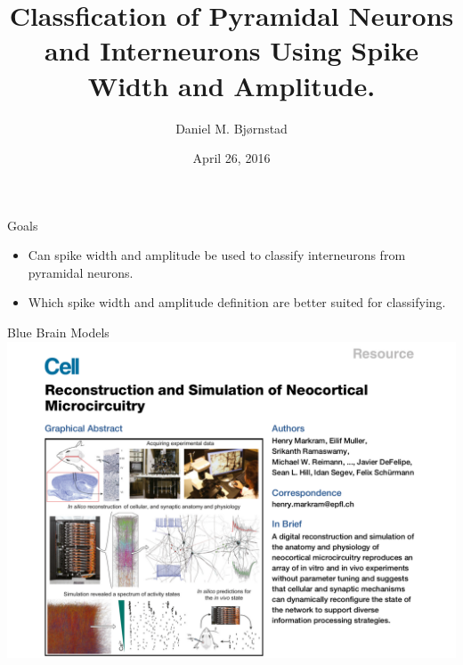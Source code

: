 \documentclass{beamer}
\title[Short title] %
{
    Classfication of Pyramidal Neurons and Interneurons Using 
    Spike Width and Amplitude.%
}
\author %
{Daniel M. Bj\o rnstad}
\date{April 26, 2016}
\institute
{
    CINPLA - Weekly Meeting
}
\begin{document}
\begin{frame}
  \titlepage
\end{frame}





\begin{frame}{Goals}
    \begin{itemize}
        \item Can spike width and amplitude be used to classify interneurons from
            pyramidal neurons.
        \item Which spike width and amplitude definition are better suited for classifying.
    \end{itemize}
\end{frame}

\begin{frame}{Blue Brain Models}
    \centering
    \includegraphics[width=\textwidth]{images/markram_front.png}
\end{frame}
\end{document}

